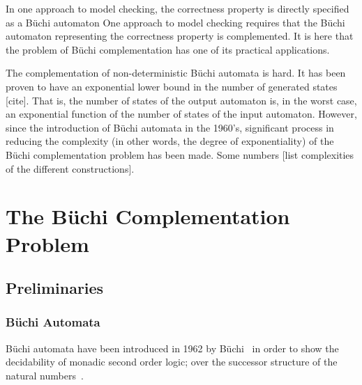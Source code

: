 \documentclass[a4paper]{report}
\begin{document}
In one approach to model checking, the correctness property is directly specified as a Büchi automaton
One approach to model checking requires that the Büchi automaton representing the correctness property is complemented. It is here that the problem of Büchi complementation has one of its practical applications. 

The complementation of non-deterministic Büchi automata is hard. It has been proven to have an exponential lower bound in the number of generated states [cite]. That is, the number of states of the output automaton is, in the worst case, an exponential function of the number of states of the input automaton. However, since the introduction of Büchi automata in the 1960's, significant process in reducing the complexity (in other words, the degree of exponentiality) of the Büchi complementation problem has been made. Some numbers [list complexities of the different constructions].





\chapter{The Büchi Complementation Problem}
\section{Preliminaries}
\subsection{Büchi Automata}
Büchi automata have been introduced in 1962 by Büchi~\cite{buchi1960decision} in order to show the decidability of monadic second order logic; over the successor structure of the natural numbers~\cite{2012_breuers}.
\end{document}
